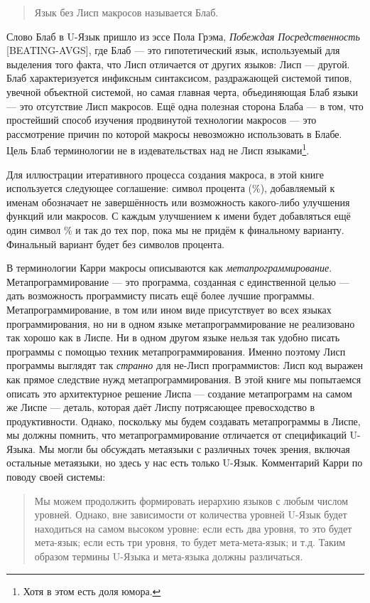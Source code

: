 \begin{quote}
Язык без Лисп макросов называется Блаб.
\end{quote}

Слово Блаб в U-Язык пришло из эссе Пола Грэма, \emph{Побеждая Посредственность} [BEATING-AVGS], где Блаб --- это гипотетический язык, используемый для выделения того факта, что Лисп отличается от других языков: Лисп --- другой. Блаб характеризуется инфиксным синтаксисом, раздражающей системой типов, увечной объектной системой, но самая главная черта, объединяющая Блаб языки --- это отсутствие Лисп макросов. Ещё одна полезная сторона Блаба --- в том, что простейший способ изучения продвинутой технологии макросов --- это рассмотрение причин по которой макросы невозможно использовать в Блабе. Цель Блаб терминологии не в издевательствах над не Лисп языками\footnote{Хотя в этом есть доля юмора.}.

Для иллюстрации итеративного процесса создания макроса, в этой книге используется следующее соглашение: символ процента (\%), добавляемый к именам обозначает не завершённость или возможность какого-либо улучшения функций или макросов. С каждым улучшением к имени будет добавляться ещё один символ \% и так до тех пор, пока мы не придём к финальному варианту. Финальный вариант будет без символов процента.

В терминологии Карри макросы описываются как \emph{метапрограммирование}. Метапрограммирование --- это программа, созданная с единственной целью --- дать возможность программисту писать ещё более лучшие программы. Метапрограммирование, в том или ином виде присутствует во всех языках программирования, но ни в одном языке метапрограммирование не реализовано так хорошо как в Лиспе. Ни в одном другом языке нельзя так удобно писать программы с помощью техник метапрограммирования. Именно поэтому Лисп программы выглядят так \emph{странно} для не-Лисп программистов: Лисп код выражен как прямое следствие нужд метапрограммирования. В этой книге мы попытаемся описать это архитектурное решение Лиспа --- создание метапрограмм на самом же Лиспе --- деталь, которая даёт Лиспу потрясающее превосходство в продуктивности. Однако, поскольку мы будем создавать метапрограммы в Лиспе, мы должны помнить, что метапрограммирование отличается от спецификаций U-Языка. Мы могли бы обсуждать метаязыки с различных точек зрения, включая остальные метаязыки, но здесь у нас есть только U-Язык. Комментарий Карри по поводу своей системы:

\begin{quote}
Мы можем продолжить формировать иерархию языков с любым числом уровней. Однако, вне зависимости от количества уровней U-Язык будет находиться на самом высоком уровне: если есть два уровня, то это будет мета-язык; если есть три уровня, то будет мета-мета-язык; и т.д. Таким образом термины U-Языка и мета-языка должны различаться.
\end{quote}



